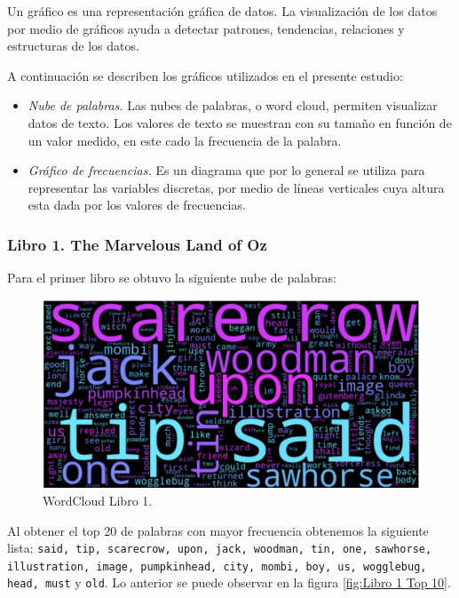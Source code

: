 \documentclass[conference]{IEEEtran}
\begin{document}
Un gráfico es una representación gráfica de datos. La visualización de los datos por medio de gráficos ayuda a detectar patrones, tendencias, relaciones y estructuras de los datos. 

A continuación se describen los gráficos utilizados en el presente estudio:

\begin{itemize}
\item \textit{Nube de palabras.} Las nubes de palabras, o word cloud, permiten visualizar datos de texto. Los valores de texto se muestran con su tamaño en función de un valor medido, en este cado la frecuencia de la palabra.

\item \textit{Gráfico de frecuencias.} Es un diagrama que por lo general se utiliza para representar las variables discretas, por medio de líneas verticales cuya altura esta dada por los valores de frecuencias.

\end{itemize}


\subsubsection{Libro 1. The Marvelous Land of Oz}

Para el primer libro se obtuvo la siguiente nube de palabras:

	\begin{figure}[h]
    \centering
    \includegraphics[width=0.8\linewidth]{Libro 1 WordCloud.png}
    \caption{WordCloud Libro 1.}
    \label{fig:Libro 1 WordCloud}
	\end{figure}

	\FloatBarrier

Al obtener el top 20 de palabras con mayor frecuencia obtenemos la siguiente lista: \texttt{said, tip, scarecrow, upon, jack, woodman, tin, one, sawhorse, illustration, image, pumpkinhead, city, mombi, boy, us, wogglebug, head, must} y \texttt{old}. Lo anterior se puede observar en la figura \ref{fig:Libro 1 Top 10}.  
\end{document}
